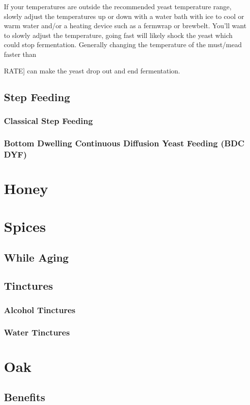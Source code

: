 \documentclass{article}
\begin{document}
   If your temperatures are outside the recommended yeast temperature range, slowly adjust the temperatures up or down with a water bath with ice to cool or 
   warm water and/or a heating device such as a fermwrap or brewbelt. You'll want to slowly adjust the temperature, going fast will likely shock the yeast which
   could stop fermentation. Generally changing the temperature of the must/mead faster than {RATE] can make the yeast drop out and end fermentation.

 \subsection{Step Feeding}
  \subsubsection{Classical Step Feeding}
  \subsubsection{Bottom Dwelling Continuous Diffusion Yeast Feeding (BDC DYF)}

\section{Honey}

\section{Spices}
 \subsection{While Aging}
 \subsection{Tinctures}
  \subsubsection{Alcohol Tinctures}
  \subsubsection{Water Tinctures}

\section{Oak}
 \subsection{Benefits}
}
\end{document}
